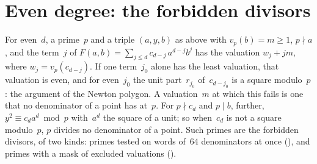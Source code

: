 \section{Even degree: the forbidden divisors}\label{sec:forbidden}

For even~$d$, a prime~$p$ and a triple $(a, y, b)$ as above with $v_p(b) = m \ge 1$, $p \nmid a$,
and the term~$j$ of $F(a, b) = \sum_{j \le d} c_{d-j}\, a^{d-j} b^j$ has the valuation $w_j + j m$,
where $w_j = v_p(c_{d-j})$. If one term~$j_0$ alone has the least valuation, that valuation is even,
and for even~$j_0$ the unit part~$r_{j_0}$ of~$c_{d-j_0}$ is a square modulo~$p$: the argument of
the Newton polygon. A valuation~$m$ at which this fails is one that no denominator of a point has
at~$p$. For $p \nmid c_d$ and $p \mid b$, further, $y^2 \equiv c_d a^d \bmod p$ with~$a^d$ the
square of a unit; so when~$c_d$ is not a square modulo~$p$, $p$ divides no denominator of a point.
Such primes are the forbidden divisors, of two kinds: primes tested on words of~$64$ denominators at
once (), and primes with a mask of excluded valuations
().

